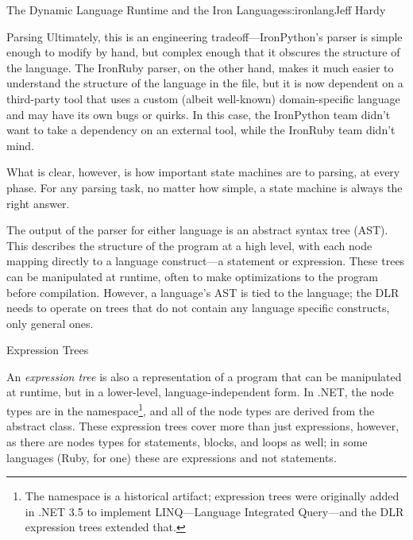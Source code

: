 \begin{aosachapter}{The Dynamic Language Runtime and the Iron Languages}{s:ironlang}{Jeff Hardy}
\begin{aosasect1}{Parsing}
Ultimately, this is an engineering tradeoff---IronPython's parser is simple enough to modify by hand, but complex enough that it obscures the structure of the language. The IronRuby parser, on the other hand, makes it much easier to understand the structure of the language in the  file, but it is now dependent on a third-party tool that uses a custom (albeit well-known) domain-specific language and may have its own bugs or quirks. In this case, the IronPython team didn't want to take a dependency on an external tool, while the IronRuby team didn't mind.

What is clear, however, is how important state machines are to parsing, at every phase. For any parsing task, no matter how simple, a state machine is always the right answer.

The output of the parser for either language is an abstract syntax tree (AST). This describes the structure of the program at a high level, with each node mapping directly to a language construct---a statement or expression.  These trees can be manipulated at runtime, often to make optimizations to the program before compilation. However, a language's AST is tied to the language; the DLR needs to operate on trees that do not contain any language specific constructs, only general ones.

\end{aosasect1}

\begin{aosasect1}{Expression Trees}

An \emph{expression tree} is also a representation of a program that can be manipulated at runtime, but in a lower-level, language-independent form. In .NET, the node types are in the  namespace\footnote{The namespace is a historical artifact; expression trees were originally added in .NET 3.5 to implement LINQ---Language Integrated Query---and the DLR expression trees extended that.}, and all of the node types are derived from the abstract  class. These expression trees cover more than just expressions, however, as there are nodes types for  statements,  blocks, and loops as well; in some languages (Ruby, for one) these are expressions and not statements.


\end{aosasect1}
\end{aosachapter}
